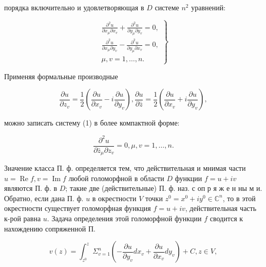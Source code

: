 \documentclass[10pt]{article}
\begin{document}
порядка включительно и удовлетворяющая в $D$ системе $n^{2}$ уравнений:



\[

\left.\begin{array}{c}

\frac{\partial^{2} u}{\partial x_{\mu} \partial x_{v}}+\frac{\partial^{2} u}{\partial y_{\mu} \partial y_{v}}=0, \\

\frac{\partial^{2} u}{\partial x_{\mu} \partial y_{v}}-\frac{\partial^{2} u}{\partial y_{\mu} \partial x_{v}}=0, \\

\mu, v=1, \ldots, n .

\end{array}\right\}

\]



Применяя формальные производные



\[

\frac{\partial u}{\partial z_{v}}=\frac{1}{2}\left(\frac{\partial u}{\partial x_{v}}-i \frac{\partial u}{\partial y_{v}}\right), \frac{\partial u}{\partial \bar{z}}=\frac{1}{2}\left(\frac{\partial u}{\partial x_{v}}+i \frac{\partial u}{\partial y_{v}}\right),

\]



можно записать систему (1) в более компактной форме:



\[

\frac{\partial^{2} u}{\partial \bar{z}_{\mu} \partial z_{v}}=0, \mu, v=1, \ldots, n .

\]



Значение класса П. ф. определяется тем, что действительная и мнимая части $u=\operatorname{Re} f, v=\operatorname{Im} f$ любой голоморфной в области $D$ функции $f=u+i v$ являются П. ф. в $D$; такие две (действительные) П. ф. наз. с оп р я ж е н ны м и. Обратно, если дана П. ф. $u$ в окрестности $V$ точки $z^{0}=x^{0}+i y^{0} \in \mathbb{C}^{n}$, то в этой окрестности существует голоморфная функция $f=u+i v$, действительная часть к-рой равна $u$. Задача определения этой голоморфной функции $f$ сводится к нахождению сопряженной П.



\[

v(z)=\int_{z^{0}}^{z} \Sigma_{v=1}^{n}\left(-\frac{\partial u}{\partial y_{v}} d x_{v}+\frac{\partial u}{\partial x_{v}} d y_{v}\right)+C, z \in V,

\]
\end{document}

